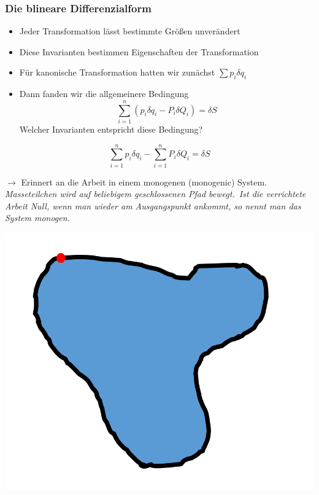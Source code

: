 \begin{frame}
    \frametitle{Die blineare Differenzialform}
    \begin{itemize}
        \item Jeder Transformation lässt bestimmte Größen unverändert
        \item Diese Invarianten bestimmen Eigenschaften der Transformation
        \item Für kanonische Transformation hatten wir zunächst $\sum p_i \delta q_i$
        \item Dann fanden wir die allgemeinere Bedingung     
                \begin{displaymath}
                \sum_{i=1}^{n} (p_i \delta q_i - P_i \delta Q_i) = \delta S
                \end{displaymath}
              Welcher Invarianten entspricht diese Bedingung?
    \end{itemize}
\end{frame}

\begin{frame}
   
        \begin{displaymath}
        \sum_{i=1}^{n} p_i \delta q_i - \sum_{i=1}^{n} P_i \delta Q_i = \delta S
        \end{displaymath}
        
        $\longrightarrow$ Erinnert an die Arbeit in einem monogenen (monogenic) System.\\
        \vspace{3mm}
        \emph{Masseteilchen wird auf beliebigem geschlossenen Pfad bewegt.\
              Ist die verrichtete Arbeit Null, wenn man wieder am Ausgangspunkt ankommt, so nennt man das System monogen.}
            
      \begin{center} \includegraphics[scale=0.15]{images/monogenicSys}  \end{center}  
        
        

\end{frame}

